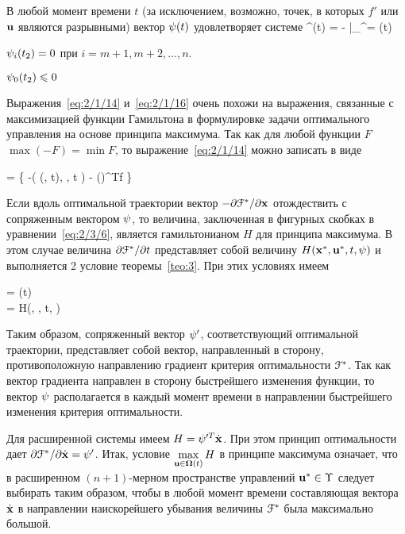         \item
            В любой момент времени $t$ (за исключением, возможно, точек, в которых $f'$ или $\mathbf{u}$ являются разрывными) вектор $\mathbf{\psi}(t)$ удовлетворяет системе
                \dot{\m{\psi}}^\prime(t) = - \biggm|_{^\prime = \optX(t)} 
            \eeq

        \item
            $\mathbf{\psi}_i(t_2) = 0$ при $i= m+1, m+2, \ldots, n$.

        \item
            $\mathbf{\psi}_0(t_2) \leqslant 0$
    \eenum
\eteo

\br

Выражения~\ref{eq:2/1/14} и~\vref{eq:2/1/16} очень похожи на выражения, связанные с максимизацией функции Гамильтона в формулировке задачи оптимального управления на основе принципа максимума. Так как для любой функции $F$ $\max(-F) = \min F$, то выражение~\ref{eq:2/1/14} можно записать в виде

     =  \Bigl\{ -\funcL\bigl( (, t), , t \bigr) - \biggl(\biggr)^Tf \Bigr\} 
\eeq

Если вдоль оптимальной траектории вектор $-\partial {    \mathcal{F}  ^{*}  } / \partial {  \mathbf{x}  }$ отождествить с сопряженным вектором $\mathbf{\psi}$, то величина, заключенная в фигурных скобках в уравнении~\ref{eq:2/3/6}, является гамильтонианом $H$ для принципа максимума. В этом случае величина $\partial {    \mathcal{F}  ^{*}  } / \partial {t}$ представляет собой величину $H({\mathbf{x}^{*}}, {\mathbf{u}^{*}}, t, \mathbf{\psi})$ и выполняется 2 условие теоремы~\vref{teo:3}. При этих условиях имеем

\beqarr
         = \m{\psi}(t) \text{;} \\
         = \funcH \eqdef H(\optX, \optU, t, \m{\psi})
\eeqarr

Таким образом, сопряженный вектор $\mathbf{\psi}'$, соответствующий оптимальной траектории, представляет собой вектор, направленный в сторону, противоположную направлению градиент критерия оптимальности $\mathcal{F}^{*}$. Так как вектор градиента направлен в сторону быстрейшего изменения функции, то вектор $\mathbf{\psi}$ располагается в каждый момент времени в направлении быстрейшего изменения критерия оптимальности.

Для расширенной системы имеем $H = \mathbf{\psi}'^T\dot{\mathbf{x}}$. При этом принцип оптимальности дает $\partial {    \mathcal{F}  ^{*}  } / \partial {\dot{  \mathbf{x}  }} = \mathbf{\psi}'$. Итак, условие $\max\limits_{\mathbf{u} \in \mathbf{\Omega}(t)} H$ в принципе максимума означает, что в расширенном $(n+1)$-мерном пространстве управлений ${\mathbf{u}^{*}} \in \Upsilon$ следует выбирать таким образом, чтобы в любой момент времени составляющая вектора $\dot{\mathbf{x}}$ в направлении наискорейшего убывания величины $\mathcal{F}^{*}$ была максимально большой.

